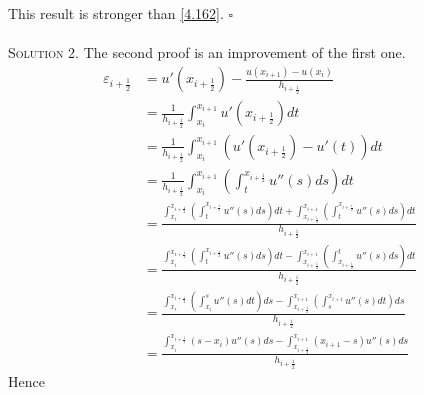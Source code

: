 \documentclass[a4paper]{article}
\numberwithin{equation}{section}
\begin{document}
This result is stronger than \eqref{4.162}. \hfill $\square$\\
\\
\textsc{Solution 2.} The second proof is an improvement of the first one.
\begin{align}
{\varepsilon _{i + \frac{1}{2}}} &= u'\left( {{x_{i + \frac{1}{2}}}} \right) - \frac{{u\left( {{x_{i + 1}}} \right) - u\left( {{x_i}} \right)}}{{{h_{i + \frac{1}{2}}}}}\\
& = \frac{1}{{{h_{i + \frac{1}{2}}}}}\int_{{x_i}}^{{x_{i + 1}}} {u'\left( {{x_{i + \frac{1}{2}}}} \right)dt} \\
& = \frac{1}{{{h_{i + \frac{1}{2}}}}}\int_{{x_i}}^{{x_{i + 1}}} {\left( {u'\left( {{x_{i + \frac{1}{2}}}} \right) - u'\left( t \right)} \right)dt} \\
& = \frac{1}{{{h_{i + \frac{1}{2}}}}}\int_{{x_i}}^{{x_{i + 1}}} {\left( {\int_t^{{x_{i + \frac{1}{2}}}} {u''\left( s \right)ds} } \right)dt} \\
& = \frac{{\int_{{x_i}}^{{x_{i + \frac{1}{2}}}} {\left( {\int_t^{{x_{i + \frac{1}{2}}}} {u''\left( s \right)ds} } \right)dt}  + \int_{{x_{i + \frac{1}{2}}}}^{{x_{i + 1}}} {\left( {\int_t^{{x_{i + \frac{1}{2}}}} {u''\left( s \right)ds} } \right)dt} }}{{{h_{i + \frac{1}{2}}}}}\\
& = \frac{{\int_{{x_i}}^{{x_{i + \frac{1}{2}}}} {\left( {\int_t^{{x_{i + \frac{1}{2}}}} {u''\left( s \right)ds} } \right)dt}  - \int_{{x_{i + \frac{1}{2}}}}^{{x_{i + 1}}} {\left( {\int_{{x_{i + \frac{1}{2}}}}^t {u''\left( s \right)ds} } \right)dt} }}{{{h_{i + \frac{1}{2}}}}}\\
& = \frac{{\int_{{x_i}}^{{x_{i + \frac{1}{2}}}} {\left( {\int_{{x_i}}^s {u''\left( s \right)dt} } \right)ds}  - \int_{{x_{i + \frac{1}{2}}}}^{{x_{i + 1}}} {\left( {\int_s^{{x_{i + 1}}} {u''\left( s \right)dt} } \right)ds} }}{{{h_{i + \frac{1}{2}}}}}\\
& = \frac{{\int_{{x_i}}^{{x_{i + \frac{1}{2}}}} {\left( {s - {x_i}} \right)u''\left( s \right)ds}  - \int_{{x_{i + \frac{1}{2}}}}^{{x_{i + 1}}} {\left( {{x_{i + 1}} - s} \right)u''\left( s \right)ds} }}{{{h_{i + \frac{1}{2}}}}}
\end{align}
Hence
\end{document}

